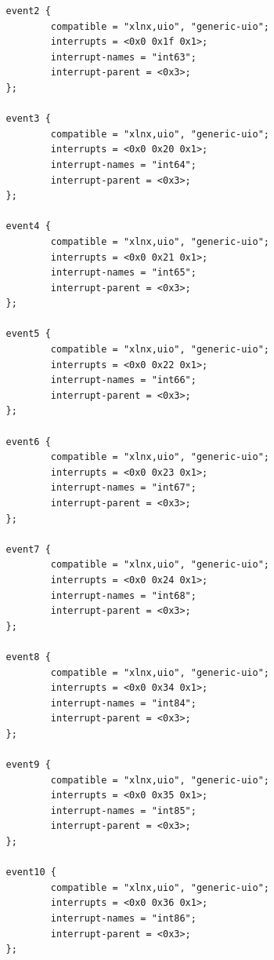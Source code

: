 \begin{verbatim}
                event2 {
                        compatible = "xlnx,uio", "generic-uio";
                        interrupts = <0x0 0x1f 0x1>;
                        interrupt-names = "int63";
                        interrupt-parent = <0x3>;
                };

                event3 {
                        compatible = "xlnx,uio", "generic-uio";
                        interrupts = <0x0 0x20 0x1>;
                        interrupt-names = "int64";
                        interrupt-parent = <0x3>;
                };

                event4 {
                        compatible = "xlnx,uio", "generic-uio";
                        interrupts = <0x0 0x21 0x1>;
                        interrupt-names = "int65";
                        interrupt-parent = <0x3>;
                };

                event5 {
                        compatible = "xlnx,uio", "generic-uio";
                        interrupts = <0x0 0x22 0x1>;
                        interrupt-names = "int66";
                        interrupt-parent = <0x3>;
                };

                event6 {
                        compatible = "xlnx,uio", "generic-uio";
                        interrupts = <0x0 0x23 0x1>;
                        interrupt-names = "int67";
                        interrupt-parent = <0x3>;
                };

                event7 {
                        compatible = "xlnx,uio", "generic-uio";
                        interrupts = <0x0 0x24 0x1>;
                        interrupt-names = "int68";
                        interrupt-parent = <0x3>;
                };

                event8 {
                        compatible = "xlnx,uio", "generic-uio";
                        interrupts = <0x0 0x34 0x1>;
                        interrupt-names = "int84";
                        interrupt-parent = <0x3>;
                };

                event9 {
                        compatible = "xlnx,uio", "generic-uio";
                        interrupts = <0x0 0x35 0x1>;
                        interrupt-names = "int85";
                        interrupt-parent = <0x3>;
                };

                event10 {
                        compatible = "xlnx,uio", "generic-uio";
                        interrupts = <0x0 0x36 0x1>;
                        interrupt-names = "int86";
                        interrupt-parent = <0x3>;
                };


\end{verbatim}
